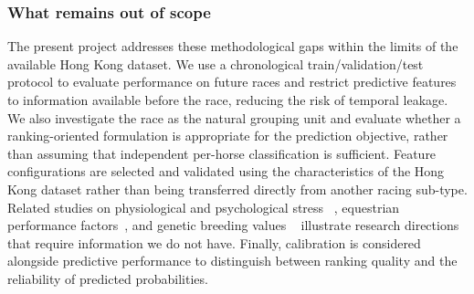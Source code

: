 \subsubsection*{\textbf{What remains out of scope}} The present project addresses these
methodological gaps within the limits of the available Hong Kong dataset. We
use a chronological train/validation/test protocol to evaluate performance on
future races and restrict predictive features to information available before
the race, reducing the risk of temporal leakage. We also investigate the race
as the natural grouping unit and evaluate whether a ranking-oriented
formulation is appropriate for the prediction objective, rather than assuming
that independent per-horse classification is sufficient. Feature
configurations are selected and validated using the characteristics of the
Hong Kong dataset rather than being transferred directly from another racing
sub-type. Related studies on physiological and psychological stress
~\cite{ejeA_bartolome2016}, equestrian performance factors~\cite{ejeA_stachurska2019},
and genetic breeding values ~\cite{ejeA_gomez2026} illustrate research directions
that require information we do not have. Finally, calibration is considered
alongside predictive performance to distinguish between ranking quality and the
reliability of predicted probabilities.